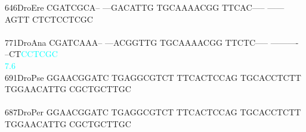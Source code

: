 \documentclass[11pt,twoside,reqno,a4paper]{article}
\begin{document}
{646\hspace*{2\charwidth}DroEre	CGATCGCA--	---GACATTG	TGCAAAACGG	TTCAC-----	------AGTT	CTCTCCTCGC	\\
\hspace*{5\charwidth}\hspace*{7\charwidth}\hspace*{1\charwidth}\hspace*{1\charwidth}\hspace*{1\charwidth}\hspace*{1\charwidth}\hspace*{1\charwidth}\hspace*{1\charwidth}\\
771\hspace*{2\charwidth}DroAna	CGATCAAA--	---ACGGTTG	TGCAAAACGG	TTCTC-----	----------	--CT\textcolor{cyan}{C}\textcolor{cyan}{C}\textcolor{cyan}{T}\textcolor{cyan}{C}\textcolor{cyan}{G}\textcolor{cyan}{C}	\\
\hspace*{5\charwidth}\hspace*{7\charwidth}\hspace*{1\charwidth}\hspace*{1\charwidth}\hspace*{1\charwidth}\hspace*{1\charwidth}\hspace*{1\charwidth}\hspace*{54\charwidth}\textcolor{cyan}{7.6}\hspace*{1\charwidth}\\
691\hspace*{2\charwidth}DroPse	GGAACGGATC	TGAGGCGTCT	TTCACTCCAG	TGCACCTCTT	TGGAACATTG	CGCTGCTTGC	\\
\hspace*{5\charwidth}\hspace*{7\charwidth}\hspace*{1\charwidth}\hspace*{1\charwidth}\hspace*{1\charwidth}\hspace*{1\charwidth}\hspace*{1\charwidth}\hspace*{1\charwidth}\\
687\hspace*{2\charwidth}DroPer	GGAACGGATC	TGAGGCGTCT	TTCACTCCAG	TGCACCTCTT	TGGAACATTG	CGCTGCTTGC	\\
\hspace*{5\charwidth}\hspace*{7\charwidth}\hspace*{1\charwidth}\hspace*{1\charwidth}\hspace*{1\charwidth}\hspace*{1\charwidth}\hspace*{1\charwidth}\hspace*{1\charwidth}\\
}
\end{document}
